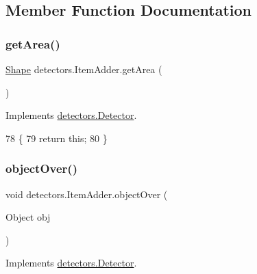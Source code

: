 \subsection{Member Function Documentation}
\mbox{\label{classdetectors_1_1_item_adder_ae42202ce2878233f85ab4a7b2d446140}} 
\subsubsection{\texorpdfstring{get\+Area()}{getArea()}}
{\footnotesize\ttfamily \mbox{\hyperlink{classorg_1_1newdawn_1_1slick_1_1geom_1_1_shape}{Shape}} detectors.\+Item\+Adder.\+get\+Area (\begin{DoxyParamCaption}{ }\end{DoxyParamCaption})\hspace{0.3cm}{\ttfamily [inline]}}



Implements \mbox{\hyperlink{interfacedetectors_1_1_detector_a0b2ecb13c6db0ff6a02e57c193bcf8b2}{detectors.\+Detector}}.


\begin{DoxyCode}
78                            \{
79         \textcolor{keywordflow}{return} \textcolor{keyword}{this};
80     \}
\end{DoxyCode}
\mbox{\label{classdetectors_1_1_item_adder_a434a5f13dfd6987f9a55f9ccb7cf0d68}} 
\subsubsection{\texorpdfstring{object\+Over()}{objectOver()}}
{\footnotesize\ttfamily void detectors.\+Item\+Adder.\+object\+Over (\begin{DoxyParamCaption}\item[{Object}]{obj }\end{DoxyParamCaption})\hspace{0.3cm}{\ttfamily [inline]}}



Implements \mbox{\hyperlink{interfacedetectors_1_1_detector_ab35eeb78e8216f8100d4651993668d44}{detectors.\+Detector}}.


